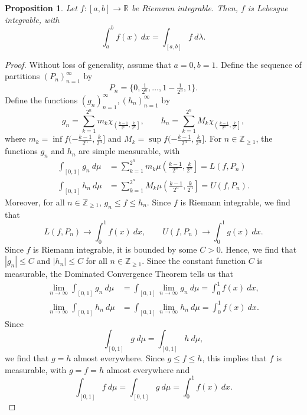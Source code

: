 \documentclass[a4paper, openany]{memoir}
\theoremstyle{definition}
\theoremstyle{plain}
\newtheorem{proposition}[definition]{Proposition}
\begin{document}
        
    
    \begin{proposition}
        Let $f \colon [a, b] \to \mathbb{R}$ be Riemann integrable. Then, $f$ is Lebesgue integrable, with
        \[\int_a^b f(x) \ dx = \int_{[a, b]} f \ d\lambda.\]
    \end{proposition}
    \begin{proof}
        Without loss of generality, assume that $a = 0, b = 1$. Define the sequence of partitions $(P_n)_{n=1}^\infty$ by 
        \[P_n = \{0, \tfrac{1}{2^n}, \dots, 1 - \tfrac{1}{2^n}, 1\}.\]
        Define the functions $(g_n)_{n=1}^\infty, (h_n)_{n=1}^\infty$ by
        \[g_n = \sum_{k=1}^{2^n} m_k \chi_{\left(\tfrac{k-1}{2^n}, \tfrac{k}{2^n}\right]}, \qquad h_n = \sum_{k=1}^{2^n} M_k \chi_{\left(\tfrac{k-1}{2^n}, \tfrac{k}{2^n}\right]},\]
        where $m_k = \inf f(-\tfrac{k-1}{2^n}, \tfrac{k}{2^n}]$ and $M_k = \sup f(-\tfrac{k-1}{2^n}, \tfrac{k}{2^n}]$. For $n \in \mathbb{Z}_{\geq 1}$, the functions $g_n$ and $h_n$ are simple measurable, with
        \begin{align*}
            \int_{[0, 1]} g_n \ d\mu &= \sum_{k=1}^{2^n} m_k \mu \left(\tfrac{k-1}{2^n}, \tfrac{k}{2^n}\right] = L(f, P_n) \\
            \int_{[0, 1]} h_n \ d\mu &= \sum_{k=1}^{2^n} M_k \mu \left(\tfrac{k-1}{2^n}, \tfrac{k}{2^n}\right] = U(f, P_n).
        \end{align*}
        Moreover, for all $n \in \mathbb{Z}_{\geq 1}$, $g_n \leq f \leq h_n$. Since $f$ is Riemann integrable, we find that
        \[L(f, P_n) \to \int_0^1 f(x) \ dx, \qquad U(f, P_n) \to \int_0^1 g(x) \ dx.\]
        Since $f$ is Riemann integrable, it is bounded by some $C > 0$. Hence, we find that $|g_n| \leq C$ and $|h_n| \leq C$ for all $n \in \mathbb{Z}_{\geq 1}$. Since the constant function $C$ is measurable, the Dominated Convergence Theorem tells us that 
        \begin{align*}
            \lim_{n \to \infty} \int_{[0, 1]} g_n \ d\mu &= \int_{[0, 1]} \lim_{n \to \infty} g_n \ d\mu = \int_0^1 f(x) \ dx, \\
            \lim_{n \to \infty} \int_{[0, 1]} h_n \ d\mu &= \int_{[0, 1]} \lim_{n \to \infty} h_n \ d\mu = \int_0^1 f(x) \ dx.
        \end{align*}
        Since
        \[\int_{[0, 1]} g \ d\mu = \int_{[0, 1]} h \ d\mu,\]
        we find that $g = h$ almost everywhere. Since $g \leq f \leq h$, this implies that $f$ is measurable, with $g = f = h$ almost everywhere and
        \[\int_{[0, 1]} f \ d\mu = \int_{[0, 1]} g \ d\mu = \int_0^1 f(x) \ dx.\]
    \end{proof}
    \newpage
\end{document}
